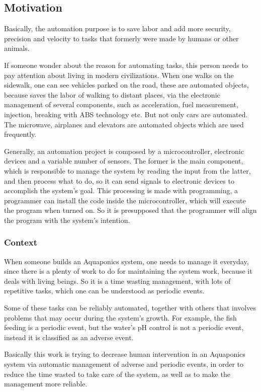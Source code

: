\subsection{Motivation}
Basically,
the automation purpose is to save labor and add more security,
precision and velocity to tasks that formerly were made by humans or other animals.

If someone wonder about the reason for automating tasks,
this person needs to pay attention about living in modern civilizations.
When one walks on the sidewalk,
one can see vehicles parked on the road,
these are automated objects,
because saves the labor of walking to distant places,
via the electronic management of several components,
such as acceleration,
fuel measurement,
injection,
breaking with ABS technology etc.
But not only cars are automated.
The microwave,
airplanes and elevators are automated objects which are used frequently.

Generally, 
an automation project is composed by a microcontroller, 
electronic devices and a variable number of sensors.
The former is the main component,
which is responsible to manage the system by reading the input from the latter,
and then process what to do,
so it can send signals to electronic devices to accomplish the system's goal.
This processing is made with programming,
a programmer can install the code inside the microcontroller,
which will execute the program when turned on.
So it is presupposed that the programmer will align the program with the system's intention.

\subsubsection{Context}
When someone builds an Aquaponics system,
one needs to manage it everyday,
since there is a plenty of work to do for maintaining the system work,
because it deals with living beings.
So it is a time wasting management,
with lots of repetitive tasks,
which one can be understood as periodic events.

Some of these tasks can be reliably automated,
together with others that involves problems that may occur during the system's growth.
For example, the fish feeding is a periodic event,
but the water's pH control is not a periodic event,
instead it is classified as an adverse event.

Basically this work is trying to decrease human intervention in an Aquaponics system via automatic management of adverse and periodic events,
in order to reduce the time wasted to take care of the system, 
as well as to make the management more reliable.


